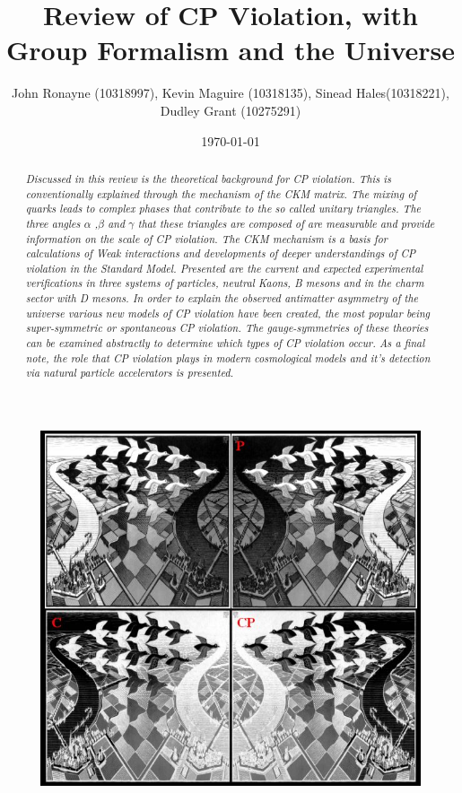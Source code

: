 \documentclass[floatfix,aps,prd,amsmath,amssymb]{revtex4}
\begin{document}
\title{Review of CP Violation, with Group Formalism and the Universe}
\author{John Ronayne (10318997), Kevin Maguire (10318135), Sinead Hales(10318221), Dudley Grant (10275291)}
\date{\today}

\begin{abstract}
\textit{Discussed in this review is the theoretical background for CP violation. This is conventionally explained through the mechanism of the CKM matrix. The mixing of quarks leads to complex phases that contribute to the so called unitary triangles. The three angles $\alpha$ ,$\beta$ and $\gamma$ that these triangles are composed of are measurable and provide information on the scale of CP violation. The CKM mechanism is a basis for calculations of Weak interactions and developments of deeper understandings of CP violation in the Standard Model. Presented are the current and expected experimental verifications in three systems of particles, neutral Kaons, B mesons and in the charm sector with D mesons. In order to explain the observed antimatter asymmetry of the universe various new models of CP violation have been created, the most popular being super-symmetric or spontaneous CP violation. The gauge-symmetries of these theories can be examined abstractly to determine which types of CP violation occur. As a final note, the role that CP violation plays in modern cosmological models and it's detection via natural particle accelerators is presented. }
\end{abstract}

\maketitle
{}

\begin{figure}[h!]
\begin{center}
\includegraphics[scale=0.8]{figs/Cover.jpg}
\end{center}
\end{figure}
\end{document}
